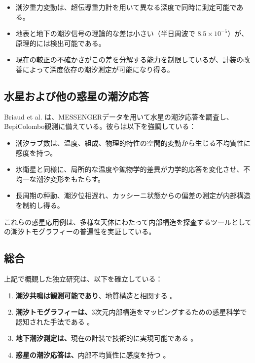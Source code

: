 \documentclass[12pt,a4paper]{article}
\theoremstyle{remark}
\begin{document}
	\begin{itemize}
		\item 潮汐重力変動は、超伝導重力計を用いて異なる深度で同時に測定可能である。
		\item 地表と地下の潮汐信号の理論的な差は小さい（半日周波で \(8.5 \times 10^{-5}\)）が、原理的には検出可能である。
		\item 現在の較正の不確かさがこの差を分解する能力を制限しているが、計装の改善によって深度依存の潮汐測定が可能になり得る。
	\end{itemize}
	
	\subsection{水星および他の惑星の潮汐応答}
	
	Briaud et al. \cite{Briaud2025} は、MESSENGERデータを用いて水星の潮汐応答を調査し、BepiColombo観測に備えている。彼らは以下を強調している：
	
	\begin{itemize}
		\item 潮汐ラブ数は、温度、組成、物理的特性の空間的変動から生じる不均質性に感度を持つ。
		\item 氷衛星と同様に、局所的な温度や鉱物学的差異が力学的応答を変化させ、不均一な潮汐変形をもたらす。
		\item 長周期の秤動、潮汐位相遅れ、カッシーニ状態からの偏差の測定が内部構造を制約し得る。
	\end{itemize}
	
	これらの惑星応用例は、多様な天体にわたって内部構造を探査するツールとしての潮汐トモグラフィーの普遍性を実証している。
	
	\subsection{総合}
	
	上記で概観した独立研究は、以下を確立している：
	
	\begin{enumerate}
		\item \textbf{潮汐共鳴は観測可能であり}、地質構造と相関する \cite{Sibgatulin2014}。
		\item \textbf{潮汐トモグラフィーは、}3次元内部構造をマッピングするための惑星科学で認知された手法である \cite{RoviraNavarro2025}。
		\item \textbf{地下潮汐測定は、}現在の計装で技術的に実現可能である \cite{Rogister2024}。
		\item \textbf{惑星の潮汐応答は、}内部不均質性に感度を持つ \cite{Briaud2025}。
	\end{enumerate}
	
\end{document}
